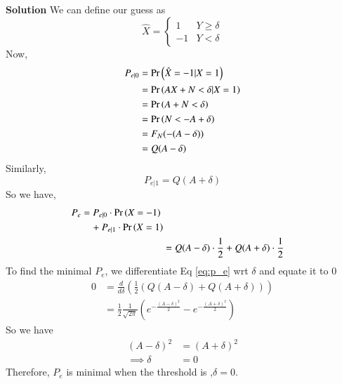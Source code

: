 \documentclass[journal,12pt,twocolumn]{IEEEtran}
\renewcommand\thesection{\arabic{section}}
\begin{document}
\begin{enumerate}[label=\thesection.\arabic*
,ref=\thesection.\theenumi]
\textbf{Solution} We can define our guess as
        \begin{equation}
            \hat{X} = \begin{cases}
                1 & Y \geq \delta \\
                -1 & Y < \delta
            \end{cases}
        \end{equation}
        Now,
        \begin{align}
            P_{e|0} &= \Pr\left(\hat{X} = -1 | X = 1\right) \\
            &= \Pr\left(AX + N < \delta | X = 1\right) \\
            &= \Pr\left(A + N < \delta\right) \\
            &= \Pr\left(N < -A + \delta\right) \\
            &= F_N(-(A - \delta)) \\
            &= Q(A - \delta)
        \end{align}
        Similarly,
        \begin{equation}
            P_{e|1} = Q(A + \delta)
        \end{equation}
        So we have,
        \begin{align}
        \begin{split}
            P_e &= P_{e|0} \cdot \Pr\left(X = -1\right) \\
            &\quad+ P_{e|1} \cdot \Pr\left(X = 1\right)
        \end{split} \\
            &= Q(A - \delta) \cdot \frac{1}{2} + Q(A + \delta) \cdot \frac{1}{2} \label{eq:p_e}
        \end{align}
        To find the minimal $P_e$, we differentiate Eq \eqref{eq:p_e} wrt $\delta$ and equate it to
        0
        \begin{align}
            0 &= \frac{d}{d\delta}\left(\frac{1}{2}\left(Q(A-\delta) + Q(A+\delta)\right)\right) \\
            &= \frac{1}{2} \frac{1}{\sqrt{2\pi}}
                \left(e^{-\frac{(A-\delta)^2}{2}} - e^{-\frac{(A+\delta)^2}{2}}\right)
        \end{align}
        So we have
        \begin{align}
            (A - \delta)^2 &= (A + \delta)^2 \\
            \implies \delta &= 0
        \end{align}
        Therefore, $P_e$ is minimal when the threshold is ,$\delta = 0$.


\end{enumerate}
\end{document}
